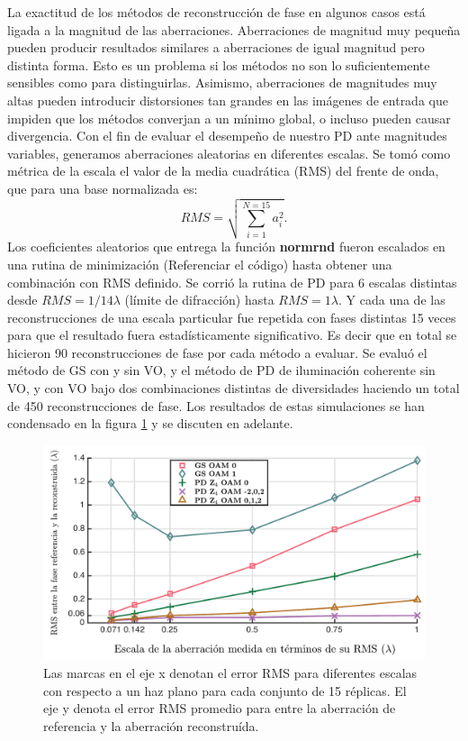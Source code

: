 La exactitud de los métodos de reconstrucción de fase en algunos casos
está ligada a la magnitud de las aberraciones. Aberraciones de
magnitud muy pequeña pueden producir resultados similares a
aberraciones de igual magnitud pero distinta forma. Esto es un
problema si los métodos no son lo suficientemente sensibles como para
distinguirlas. Asimismo, aberraciones de magnitudes muy altas pueden
introducir distorsiones tan grandes en las imágenes de entrada que
impiden que los métodos converjan a un mínimo global, o incluso pueden
causar divergencia. Con el fin de evaluar el desempeño de nuestro
PD ante magnitudes variables, generamos aberraciones aleatorias en diferentes
escalas. Se tomó como métrica de la escala el valor de la media
cuadrática (RMS) del frente de onda, que para una base normalizada es:
$$RMS =  \sqrt{\sum_{i=1}^{N=15}a_i^2 }.$$
Los coeficientes aleatorios que entrega la función \textbf{normrnd}
fueron escalados en una rutina de minimización (Referenciar el código)
hasta obtener una combinación con RMS definido. 
Se corrió la rutina de PD para 6 escalas distintas desde $RMS = 1/14\lambda$ (límite de
difracción) hasta $RMS = 1\lambda$. Y cada una de las reconstrucciones
de una escala particular fue repetida con fases distintas 15 veces
para que el resultado fuera estadísticamente significativo. Es decir
que en total se hicieron  90 reconstrucciones de fase por cada método
a evaluar. Se evaluó el método de GS con y sin VO, y el método de PD
de iluminación coherente sin VO, y con VO bajo dos combinaciones
distintas de diversidades haciendo un total de 450 reconstrucciones de
fase.  
Los resultados de estas simulaciones se han condensado en la figura
\ref{fig:ChPD_RMS_error} y se discuten en adelante. 
\begin{figure}[h!]
\centering
\includegraphics[scale=.6]{WF_errors_new_colors_esp.pdf}
\caption[Resultados de simulaciones con PD de iluminación
coherente.]{Las marcas en el eje x denotan el error RMS para
  diferentes escalas con respecto a
  un haz plano para cada conjunto de 15 réplicas. El eje y denota el
  error RMS promedio para entre la aberración de referencia y la
  aberración reconstruída.} 
\label{fig:ChPD_RMS_error}
\end{figure}

